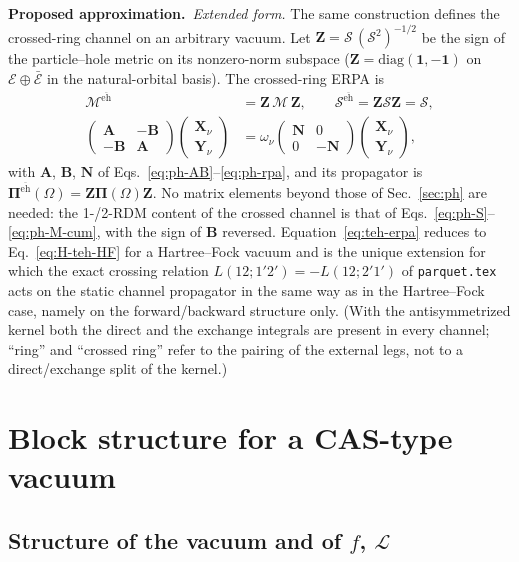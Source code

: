 \documentclass[aip,jcp,reprint,noshowkeys,superscriptaddress]{revtex4-1}
\newcommand{\bI}{\boldsymbol{1}}
\newcommand{\bA}{\boldsymbol{A}}
\newcommand{\bB}{\boldsymbol{B}}
\newcommand{\bN}{\boldsymbol{N}}
\newcommand{\bX}{\boldsymbol{X}}
\newcommand{\bY}{\boldsymbol{Y}}
\newcommand{\bZ}{\boldsymbol{Z}}
\newcommand{\bPi}{\boldsymbol{\Pi}}
\newcommand{\bcalM}{\boldsymbol{\mathcal M}}
\newcommand{\bcalS}{\boldsymbol{\mathcal S}}
\newcommand{\teh}{\overline{\text{eh}}}
\newcommand{\Lag}{\mathcal{L}}
\newcommand{\Proposed}{\textbf{Proposed approximation.}\ }
\begin{document}
\Proposed \emph{Extended form.}  The same construction defines the crossed-ring
channel on an arbitrary vacuum.  Let $\bZ=\bcalS\,(\bcalS^{2})^{-1/2}$ be the
sign of the particle--hole metric on its nonzero-norm subspace
($\bZ=\mathrm{diag}(\bI,-\bI)$ on $\mathcal E\oplus\bar{\mathcal E}$ in the
natural-orbital basis).  The crossed-ring ERPA is
\begin{align}
  \bcalM^{\teh}&=\bZ\,\bcalM\,\bZ,\qquad \bcalS^{\teh}=\bZ\bcalS\bZ=\bcalS,
  \nonumber\\
  \begin{pmatrix}\bA&-\bB\\ -\bB&\bA\end{pmatrix}
  \begin{pmatrix}\bX_\nu\\ \bY_\nu\end{pmatrix}
  &=\omega_\nu
  \begin{pmatrix}\bN&0\\0&-\bN\end{pmatrix}
  \begin{pmatrix}\bX_\nu\\ \bY_\nu\end{pmatrix},
  \label{eq:teh-erpa}
\end{align}
with $\bA$, $\bB$, $\bN$ of Eqs.~\eqref{eq:ph-AB}--\eqref{eq:ph-rpa}, and its
propagator is $\bPi^{\teh}(\Omega)=\bZ\bPi(\Omega)\bZ$.  No matrix elements
beyond those of Sec.~\ref{sec:ph} are needed: the 1-/2-RDM content of the
crossed channel is that of Eqs.~\eqref{eq:ph-S}--\eqref{eq:ph-M-cum}, with the
sign of $\bB$ reversed.  Equation~\eqref{eq:teh-erpa} reduces to
Eq.~\eqref{eq:H-teh-HF} for a Hartree--Fock vacuum and is the unique
extension for which the exact crossing relation
$L(12;1'2')=-L(12;2'1')$ of \texttt{parquet.tex} acts on the static
channel propagator in the same way as in the Hartree--Fock case, namely on
the forward/backward structure only.  (With the antisymmetrized kernel both
the direct and the exchange integrals are present in every channel; ``ring''
and ``crossed ring'' refer to the pairing of the external legs, not to a
direct/exchange split of the kernel.)

\section{Block structure for a CAS-type vacuum}
\label{sec:blocks}

\subsection{Structure of the vacuum and of \texorpdfstring{$f$, $\Lag$}{f, L}}
\label{sec:cas-structure}
\end{document}
